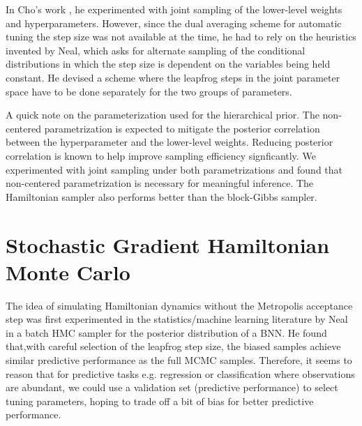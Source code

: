 \documentclass[12pt]{report}
\begin{document}
In Cho's work \cite{choo2000learning}, he experimented with joint sampling of the lower-level weights and hyperparameters. However, since the dual averaging scheme for automatic tuning the step size was not available at the time, he had to rely on the heuristics invented by Neal, which asks for alternate sampling of the conditional distributions in which the step size is dependent on the variables being held constant. He devised a scheme where the leapfrog steps in the joint parameter space have to be done separately for the two groups of parameters. 

A quick note on the parameterization used for the hierarchical prior. The non-centered parametrization is expected to mitigate the posterior correlation between the hyperparameter and the lower-level weights. Reducing posterior correlation is known to help improve sampling efficiency signficantly. We experimented with joint sampling under both parametrizations and found that non-centered parametrization is necessary for meaningful inference. The Hamiltonian sampler also performs better than the block-Gibbs sampler.

\section{Stochastic Gradient Hamiltonian Monte Carlo}
The idea of simulating Hamiltonian dynamics without the Metropolis acceptance step was first experimented in the statistics/machine learning literature by Neal \cite{neal1993bayesian} in a batch HMC sampler for the posterior distribution of a BNN. He found that,with careful selection of the leapfrog step size, the biased samples achieve similar predictive performance as the full MCMC samples. Therefore, it seems to reason that for predictive tasks e.g. regression or classification where observations are abundant, we could 
use a validation set (predictive performance) to select tuning parameters, hoping to trade off a bit of bias for better predictive performance. 
\end{document}
